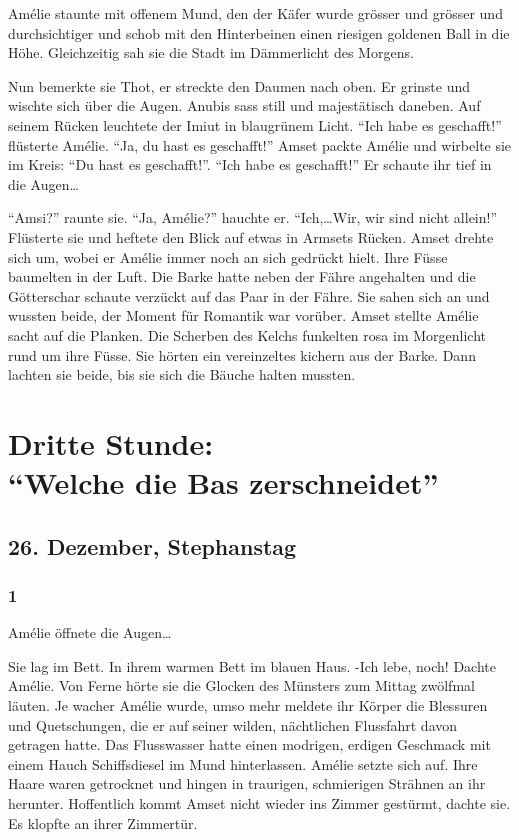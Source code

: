 \documentclass[11pt,titlepage,a5paper]{book}
\begin{document}
Amélie staunte mit offenem Mund, den der Käfer wurde grösser und grösser und durchsichtiger und schob mit den Hinterbeinen einen riesigen goldenen Ball in die Höhe. Gleichzeitig sah sie die Stadt im Dämmerlicht des Morgens.

Nun bemerkte sie Thot, er streckte den Daumen nach oben. Er grinste und wischte sich über die Augen. Anubis sass still und majestätisch daneben. Auf seinem Rücken leuchtete der Imiut in blaugrünem Licht. "`Ich habe es geschafft!"' flüsterte Amélie. "`Ja, du hast es geschafft!"' Amset packte Amélie und wirbelte sie im Kreis: "`Du hast es geschafft!"'. "`Ich habe es geschafft!"' Er schaute ihr tief in die Augen\dots

"`Amsi?"' raunte sie. "`Ja, Amélie?"' hauchte er. "`Ich,\dots Wir, wir sind nicht allein!"' Flüsterte sie und heftete den Blick auf etwas in Armsets Rücken. Amset drehte sich um, wobei er Amélie immer noch an sich gedrückt hielt. Ihre Füsse baumelten in der Luft. Die Barke hatte neben der Fähre angehalten und die Götterschar schaute verzückt auf das Paar in der Fähre. Sie sahen sich an und wussten beide, der Moment für Romantik war vorüber. Amset stellte Amélie sacht auf die Planken. Die Scherben des Kelchs funkelten rosa im Morgenlicht rund um ihre Füsse. Sie hörten ein vereinzeltes kichern aus der Barke. Dann lachten sie beide, bis sie sich die Bäuche halten mussten. 

\part*{Dritte Stunde:\\"`Welche die Bas zerschneidet"'}

\chapter*{26. Dezember, Stephanstag}

\section*{1}

Amélie öffnete die Augen\dots

Sie lag im Bett. In ihrem warmen Bett im blauen Haus. -Ich lebe, noch! Dachte Amélie. Von Ferne hörte sie die Glocken des Münsters zum Mittag zwölfmal läuten. Je wacher Amélie wurde, umso mehr meldete ihr Körper die Blessuren und Quetschungen, die er auf seiner wilden, nächtlichen Flussfahrt davon getragen hatte. Das Flusswasser hatte einen modrigen, erdigen Geschmack mit einem Hauch Schiffsdiesel im Mund hinterlassen. Amélie setzte sich auf. Ihre Haare waren getrocknet und hingen in traurigen, schmierigen Strähnen an ihr herunter. Hoffentlich kommt Amset nicht wieder ins Zimmer gestürmt, dachte sie. Es klopfte an ihrer Zimmertür.
\end{document}
